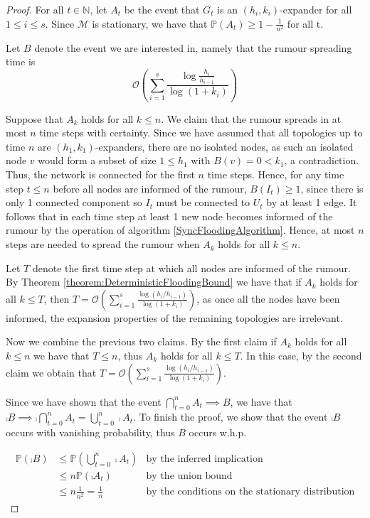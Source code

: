 \begin{proof}
	For all $t \in \mathbb{N}$, let $A_t$ be the event that $G_t$ is an $(h_i, k_i)$-expander for all $1 \leq i \leq s$. Since $\mathcal{M}$ is stationary, we have that $\mathbb{P}(A_t) \geq 1 - \frac{1}{n^2}$ for all t. 

	Let $B$ denote the event we are interested in, namely that the rumour spreading time is 	
	$$
		\mathcal{O}\left(\sum_{i=1}^s \frac{\log \frac{h_i}{h_{i-1}}}{\log(1+k_i)}\right)
	$$

	Suppose that $A_k$ holds for all $k \leq n$. We claim that the rumour spreads in at most $n$ time steps with certainty. Since we have assumed that all topologies up to time $n$ are $(h_1, k_1)$-expanders, there are no isolated nodes, as such an isolated node $v$ would form a subset of size $1 \leq h_1$ with $B({v}) = 0 < k_1$, a contradiction. Thus, the network is connected for the first $n$ time steps. Hence, for any time step $t \leq n$ before all nodes are informed of the rumour, $B(I_t) \geq 1$, since there is only 1 connected component so $I_t$ must be connected  to $U_t$ by at least 1 edge. It follows that in each time step at least 1 new node becomes informed of the rumour by the operation of algorithm \ref{SyncFloodingAlgorithm}. Hence, at most $n$ steps are needed to spread the rumour when $A_k$ holds for all $k \leq n$. 

	Let $T$ denote the first time step at which all nodes are informed of the rumour. By Theorem \ref{theorem:DeterministicFloodingBound} we have that if $A_k$ holds for all $k \leq T$, then $T=\mathcal{O}\left(\sum_{i=1}^s \frac{\log (h_i/h_{i-1})}{\log(1+k_i)}\right)$, as once all the nodes have been informed, the expansion properties of the remaining topologies are irrelevant.

	Now we combine the previous two claims. By the first claim if $A_k$ holds for all $k \leq n$ we have that $T \leq n$, thus $A_k$ holds for all $k \leq T$. In this case, by the second claim we obtain that  $T=\mathcal{O}\left(\sum_{i=1}^s \frac{\log (h_i/h_{i-1})}{\log(1+k_i)}\right)$.

	Since we have shown that the event $\bigcap_{t=0}^n A_t \implies B$, we have that $\comp{B} \implies \comp{ \bigcap_{t=0}^n A_t} = \bigcup_{t=0}^n \comp{A_t}$. To finish the proof, we show that the event $\comp{B}$ occurs with vanishing probability, thus $B$ occurs w.h.p.

	\begin{align*}
		\mathbb{P}(\comp{B}) &\leq \mathbb{P}(\bigcup_{t=0}^n \comp{A_t}) & \text{by the inferred implication} \\ 
		& \leq n \mathbb{P}(\comp{A_t}) & \text{by the union bound}\\ 
		& \leq n \frac{1}{n^2} = \frac{1}{n} & \text{by the conditions on the stationary distribution}
	\end{align*}

\end{proof}

